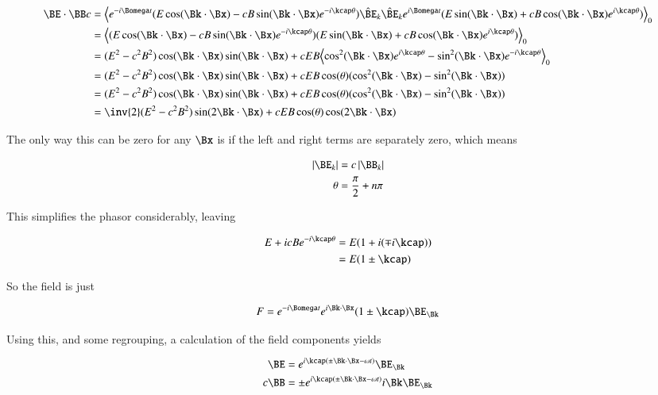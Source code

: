 \begin{align*}
\BE \cdot \BB c 
&=
\gpgradezero{
e^{-i\Bomega t} (E \cos(\Bk \cdot \Bx) - c B \sin(\Bk \cdot \Bx) e^{-i \kcap\theta}) \hat{\BE}_k 
\hat{\BE}_k
e^{i\Bomega t} (E \sin(\Bk \cdot \Bx) + c B \cos(\Bk \cdot \Bx) e^{i \kcap\theta}) 
} \\
&=
\gpgradezero{
(E \cos(\Bk \cdot \Bx) - c B \sin(\Bk \cdot \Bx) e^{-i \kcap\theta}) 
(E \sin(\Bk \cdot \Bx) + c B \cos(\Bk \cdot \Bx) e^{i \kcap\theta}) 
} \\
&=
(E^2 - c^2 B^2) \cos(\Bk \cdot \Bx) \sin(\Bk \cdot \Bx) 
+ c E B 
\gpgradezero{ 
\cos^2(\Bk \cdot \Bx) e^{i \kcap \theta}
-\sin^2(\Bk \cdot \Bx) e^{-i \kcap \theta}
} \\
&=
(E^2 - c^2 B^2) \cos(\Bk \cdot \Bx) \sin(\Bk \cdot \Bx) 
+ c E B \cos(\theta) ( \cos^2(\Bk \cdot \Bx) -\sin^2(\Bk \cdot \Bx) ) \\
&=
(E^2 - c^2 B^2) \cos(\Bk \cdot \Bx) \sin(\Bk \cdot \Bx) 
+ c E B \cos(\theta) ( \cos^2(\Bk \cdot \Bx) -\sin^2(\Bk \cdot \Bx) ) \\
&=
\inv{2} (E^2 - c^2 B^2) \sin(2 \Bk \cdot \Bx) 
+ c E B \cos(\theta) \cos(2 \Bk \cdot \Bx) \\
\end{align*}

The only way this can be zero for any $\Bx$ is if the left and right terms are separately zero, which means

\begin{align*}
\Abs{\BE_k} &= c \Abs{\BB_k} \\
\theta &= \frac{\pi}{2} + n \pi
\end{align*}

This simplifies the phasor considerably, leaving

\begin{align*}
E + i c B e^{-i\kcap \theta}
&=
E(1 + i (\mp i\kcap )) \\
&=
E(1 \pm \kcap)
\end{align*}

So the field is just

\begin{align}
F = e^{-i \Bomega t} e^{i \Bk \cdot \Bx} (1 \pm \kcap) \BE_\Bk 
\end{align}

Using this, and some regrouping, a calculation of the field components yields

\begin{align}
\BE &= e^{i \kcap( \pm \Bk \cdot \Bx -\omega t )} \BE_\Bk \\
c \BB &= \pm e^{i \kcap( \pm \Bk \cdot \Bx -\omega t )} i \Bk \BE_\Bk
\end{align}


